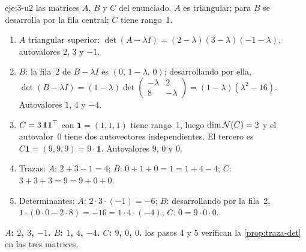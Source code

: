 \begin{solucion}{eje:3-u2}
\datos las matrices $A$, $B$ y $C$ del enunciado.
\planteamiento $A$ es triangular; para $B$ se desarrolla por la fila central; $C$ tiene rango~1.
\pasos
\begin{enumerate}[label=\arabic*.]
  \item $A$ triangular superior: $\det(A-\lambda I)=(2-\lambda)(3-\lambda)(-1-\lambda)$, autovalores $2$, $3$ y $-1$.
  \item $B$: la fila~2 de $B-\lambda I$ es $(0,\,1-\lambda,\,0)$; desarrollando por ella, $\det(B-\lambda I)=(1-\lambda)\det\begin{pmatrix}-\lambda&2\\8&-\lambda\end{pmatrix}=(1-\lambda)(\lambda^{2}-16)$. Autovalores $1$, $4$ y $-4$.
  \item $C=3\,\mathbf{1}\mathbf{1}^{\top}$ con $\mathbf{1}=(1,1,1)$ tiene rango~1, luego $\dim\mathcal{N}(C)=2$ y el autovalor~0 tiene dos autovectores independientes. El tercero es $C\mathbf{1}=(9,9,9)=9\cdot\mathbf{1}$. Autovalores $9$, $0$ y $0$.
  \item Trazas: $A$: $2+3-1=4$; $B$: $0+1+0=1=1+4-4$; $C$: $3+3+3=9=9+0+0$.
  \item Determinantes: $A$: $2\cdot 3\cdot(-1)=-6$; $B$: desarrollando por la fila~2, $1\cdot(0\cdot 0-2\cdot 8)=-16=1\cdot 4\cdot(-4)$; $C$: $0=9\cdot 0\cdot 0$.
\end{enumerate}
\resultado \textbf{$A$: $2$, $3$, $-1$. $B$: $1$, $4$, $-4$. $C$: $9$, $0$, $0$.}
\comprobacion los pasos 4 y 5 verifican la \cref{prop:traza-det} en las tres matrices.
\end{solucion}

